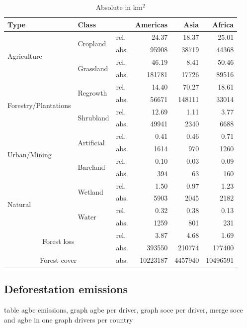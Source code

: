	    \begin{table}[ht]
		    \centering
		    \caption[Deforestation driver]{Absolute in km$^2$}
		    \label{tab:driver_tab}
		    \begin{tabular}{lllrrr}
			    Type & Class & & Americas & Asia & Africa \\\hline
			    \multirow{4}{*}{Agriculture} & \multirow{2}{*}{Cropland} & rel. & 24.37 & 18.37 & 25.01 \\
			    & & abs. & 95908 & 38719 & 44368 \\
			    & \multirow{2}{*}{Grassland} & rel. & 46.19 & 8.41 & 50.46 \\
			    & & abs. & 181781 & 17726 & 89516 \\
			    \multirow{4}{*}{Forestry/Plantations} & \multirow{2}{*}{Regrowth} & rel. & 14.40 & 70.27 & 18.61 \\
			    & & abs. & 56671 & 148111 & 33014 \\
			    & \multirow{2}{*}{Shrubland} & rel. & 12.69 & 1.11 & 3.77 \\
			    & & abs. & 49941 & 2340 & 6688 \\
			    \multirow{4}{*}{Urban/Mining} & \multirow{2}{*}{Artificial} & rel. & 0.41 & 0.46 & 0.71 \\
			    & & abs. & 1614 & 970 & 1260 \\
			    & \multirow{2}{*}{Bareland} & rel. & 0.10 & 0.03 & 0.09 \\
			    & & abs. & 394 & 63 & 160 \\
			    \multirow{4}{*}{Natural} & \multirow{2}{*}{Wetland} & rel. & 1.50 & 0.97 & 1.23 \\
			    & & abs. & 5903 & 2045 & 2182 \\
			    & \multirow{2}{*}{Water} & rel. & 0.32 & 0.38 & 0.13 \\
			    & & abs. & 1259 & 801 & 231 \\\hline
			    \multicolumn{2}{c}{\multirow{2}{*}{Forest loss}} & rel. & 3.87 & 4.68 & 1.69 \\
			    & & abs. & 393550 & 210774 & 177400 \\
			    \multicolumn{2}{c}{Forest cover} & abs. & 10223187 & 4457940 & 10496591 \\\hline
		    \end{tabular}
	    \end{table}

\clearpage

    \subsection{Deforestation emissions}
		{\color{red} table agbe emissions, graph agbe per driver, graph soce per driver, merge soce and agbe in one graph}
		{\color{red} drivers per country}

